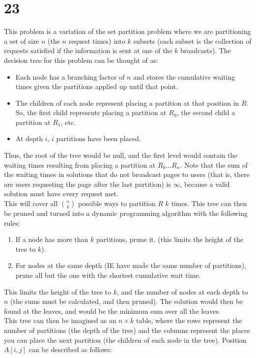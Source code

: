 \documentclass[letterpaper,notitlepage,twoside]{article}
\begin{document}
\section*{23}
This problem is a variation of the set partition problem where we are partitioning a set of size $n$ (the $n$ request times) into $k$ subsets (each subset is the collection of requests satisfied if the information is sent at one of the $k$ broadcasts). The decision tree for this problem can be thought of as:
\begin{itemize}
\item Each node has a branching factor of $n$ and stores the cumulative waiting times given the partitions applied up until that point.
\item The children of each node represent placing a partition at that position in $R$. So, the first child represents placing a partition at $R_0$, the second child a partition at $R_1$, etc. 
\item At depth $i$, $i$ partitions have been placed. 
\end{itemize}
Thus, the root of the tree would be null, and the first level would contain the waiting times resulting from placing a partition at $R_0...R_n$. Note that the sum of the waiting times in solutions that do not broadcast pages to users (that is, there are users requesting the page after the last partition) is $\infty$, because a valid solution must have every request met.\\
This will cover all $\binom{n}{k}$ possible ways to partition $R$ $k$ times. This tree can then be pruned and turned into a dynamic programming algorithm with the following rules:
\begin{enumerate}
\item If a node has more than $k$ partitions, prune it. (this limits the height of the tree to $k$).
\item For nodes at the same depth (IE have made the same number of partitions), prune all but the one with the shortest cumulative wait time. 
\end{enumerate}
This limits the height of the tree to $k$, and the number of nodes at each depth to $n$ (the sums must be calculated, and then pruned). The solution would then be found at the leaves, and would be the minimum sum over all the leaves. \\
This tree can then be imagined as an $n\times k$ table, where the rows represent the number of partitions (the depth of the tree) and the columns represent the places you can place the next partition (the children of each node in the tree). Position $A[i, j]$ can be described as follows:
\end{document}

